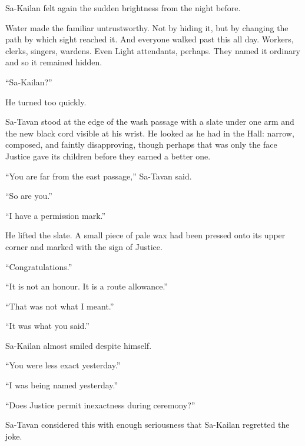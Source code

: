 Sa-Kailan felt again the sudden brightness from the night before.\par

Water made the familiar untrustworthy.
Not by hiding it, but by changing the path by which sight reached it.
And everyone walked past this all day.
Workers, clerks, singers, wardens.
Even Light attendants, perhaps.
They named it ordinary and so it remained hidden.\par

“Sa-Kailan?”\par

He turned too quickly.\par

Sa-Tavan stood at the edge of the wash passage with a slate under one arm and the new black cord visible at his wrist.
He looked as he had in the Hall: narrow, composed, and faintly disapproving, though perhaps that was only the face Justice gave its children before they earned a better one.\par

“You are far from the east passage,” Sa-Tavan said.\par

“So are you.”\par

“I have a permission mark.”\par

He lifted the slate.
A small piece of pale wax had been pressed onto its upper corner and marked with the sign of Justice.\par

“Congratulations.”\par

“It is not an honour.
It is a route allowance.”\par

“That was not what I meant.”\par

“It was what you said.”\par

Sa-Kailan almost smiled despite himself.\par

“You were less exact yesterday.”\par

“I was being named yesterday.”\par

“Does Justice permit inexactness during ceremony?”\par

Sa-Tavan considered this with enough seriousness that Sa-Kailan regretted the joke.\par

